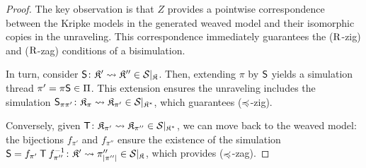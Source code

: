 
\begin{proof}
	The key observation is that $Z$ provides a pointwise correspondence between the Kripke models in the generated weaved model and their isomorphic copies in the unraveling. This correspondence immediately guarantees the ($\mathbin{\mathrm{R}}$-zig) and ($\mathbin{\mathrm{R}}$-zag) conditions of a bisimulation.

	\medskip
	\noindent
	In turn, consider ${\mathbin{\mathsf{S}} \colon \mathfrak{K}' \rightsquigarrow \mathfrak{K}''} \in \mathcal{S}_{}\vert_{\mathfrak{K}}$. Then, extending $\pi$ by $\mathbin{\mathsf{S}}$ yields a simulation thread $\pi' = \pi\mathbin{\mathsf{S}} \in \Pi$. This extension ensures the unraveling includes the simulation ${\mathbin{\mathsf{S}}_{\pi\pi'} \colon \mathfrak{K}_\pi \rightsquigarrow \mathfrak{K}_{\pi'}} \in \mathcal{S}_{}\vert_{\mathfrak{K}^{*}}$, which guarantees ($\preccurlyeq$-zig).

	\medskip
	\noindent
	Conversely, given ${\mathbin{\mathsf{T}} \colon \mathfrak{K}_{\pi'} \rightsquigarrow \mathfrak{K}_{\pi''}} \in \mathcal{S}_{}\vert_{\mathfrak{K}^{*}}$, we can move back to the weaved model: the bijections $f_{\pi'}$ and $f_{\pi''}$ ensure the existence of the simulation ${\mathbin{\mathsf{S}} = f_{\pi'} \mathbin{\mathsf{T}} f_{\pi''}^{-1} \colon \mathfrak{K}' \rightsquigarrow \pi''_{|\pi''|}} \in \mathcal{S}_{}\vert_{\mathfrak{K}}$, which provides ($\preccurlyeq$-zag).
\end{proof}

